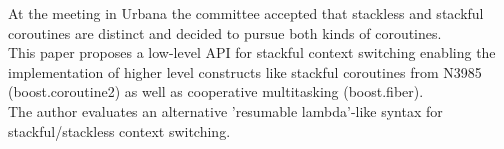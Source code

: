 At the meeting in Urbana the committee accepted that stackless and stackful
coroutines are distinct and decided to pursue both kinds of coroutines.\\
This paper proposes a low-level API for stackful context switching enabling the
implementation of higher level constructs like stackful coroutines from N3985
(boost.coroutine2\cite{bcoroutine2}) as well as cooperative multitasking
(boost.fiber\cite{bfiber}).\\
The author evaluates an alternative 'resumable lambda'-like syntax for
stackful/stackless context switching.
